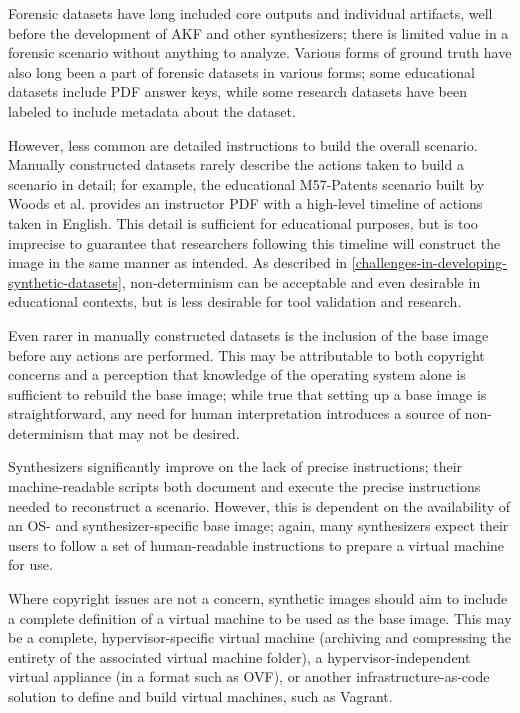 Forensic datasets have long included core outputs and individual
artifacts, well before the development of AKF and other synthesizers;
there is limited value in a forensic scenario without anything to
analyze. Various forms of ground truth have also long been a part of
forensic datasets in various forms; some educational datasets include
PDF answer keys, while some research datasets have been labeled to
include metadata about the dataset.

However, less common are detailed instructions to build the overall
scenario. Manually constructed datasets rarely describe the actions
taken to build a scenario in detail; for example, the educational
M57-Patents scenario built by Woods et al.
\cite{woodsCreatingRealisticCorpora2011} provides an instructor PDF
with a high-level timeline of actions taken in English. This detail is
sufficient for educational purposes, but is too imprecise to guarantee
that researchers following this timeline will construct the image in the
same manner as intended. As described in \autoref{challenges-in-developing-synthetic-datasets},
non-determinism can be acceptable and even desirable in educational
contexts, but is less desirable for tool validation and research.

Even rarer in manually constructed datasets is the inclusion of the base
image before any actions are performed. This may be attributable to both
copyright concerns and a perception that knowledge of the operating
system alone is sufficient to rebuild the base image; while true that
setting up a base image is straightforward, any need for human
interpretation introduces a source of non-determinism that may not be
desired.

Synthesizers significantly improve on the lack of precise instructions;
their machine-readable scripts both document and execute the precise
instructions needed to reconstruct a scenario. However, this is
dependent on the availability of an OS- and synthesizer-specific base
image; again, many synthesizers expect their users to follow a set of
human-readable instructions to prepare a virtual machine for use.

Where copyright issues are not a concern, synthetic images should aim to
include a complete definition of a virtual machine to be used as the
base image. This may be a complete, hypervisor-specific virtual machine
(archiving and compressing the entirety of the associated virtual
machine folder), a hypervisor-independent virtual appliance (in a format
such as OVF), or another infrastructure-as-code solution to define and
build virtual machines, such as Vagrant.

